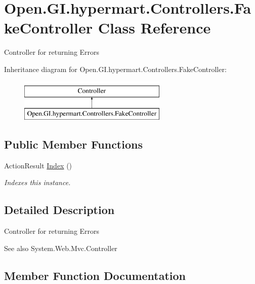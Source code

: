 \hypertarget{class_open_1_1_g_i_1_1hypermart_1_1_controllers_1_1_fake_controller}{}\section{Open.\+G\+I.\+hypermart.\+Controllers.\+Fake\+Controller Class Reference}
\label{class_open_1_1_g_i_1_1hypermart_1_1_controllers_1_1_fake_controller}


Controller for returning Errors  


Inheritance diagram for Open.\+G\+I.\+hypermart.\+Controllers.\+Fake\+Controller\+:\begin{figure}[H]
\begin{center}
\leavevmode
\includegraphics[height=2.000000cm]{class_open_1_1_g_i_1_1hypermart_1_1_controllers_1_1_fake_controller}
\end{center}
\end{figure}
\subsection*{Public Member Functions}
\begin{DoxyCompactItemize}
\item 
Action\+Result \hyperlink{class_open_1_1_g_i_1_1hypermart_1_1_controllers_1_1_fake_controller_a783fcc0fd5e686066951dc93380d02bd}{Index} ()
\begin{DoxyCompactList}\small\item\em Indexes this instance. \end{DoxyCompactList}\end{DoxyCompactItemize}


\subsection{Detailed Description}
Controller for returning Errors 

\begin{DoxySeeAlso}{See also}
System.\+Web.\+Mvc.\+Controller


\end{DoxySeeAlso}


\subsection{Member Function Documentation}
\hypertarget{class_open_1_1_g_i_1_1hypermart_1_1_controllers_1_1_fake_controller_a783fcc0fd5e686066951dc93380d02bd}{}\label{class_open_1_1_g_i_1_1hypermart_1_1_controllers_1_1_fake_controller_a783fcc0fd5e686066951dc93380d02bd} 
